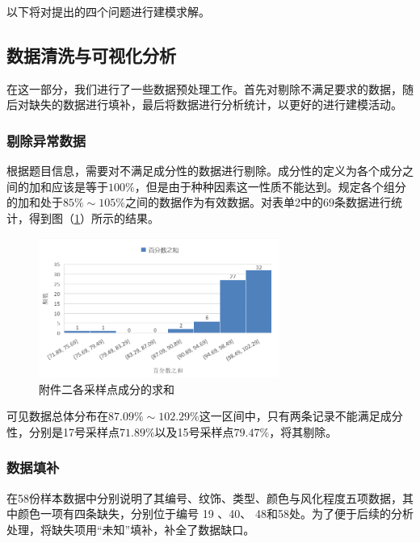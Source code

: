 \documentclass{my_paper}
\begin{document}
以下将对提出的四个问题进行建模求解。
\subsection{数据清洗与可视化分析}
在这一部分，我们进行了一些数据预处理工作。首先对剔除不满足要求的数据，随后对缺失的数据进行填补，最后将数据进行分析统计，以更好的进行建模活动。

\subsubsection{剔除异常数据}
根据题目信息，需要对不满足成分性的数据进行剔除。成分性的定义为各个成分之间的加和应该是等于$ 100\% $，但是由于种种因素这一性质不能达到。规定各个组分的加和处于$85\%\sim 105\%$之间的数据作为有效数据。对表单2中的69条数据进行统计，得到图（\ref{51}）所示的结果。
\begin {figure}[h]
\centering %
\includegraphics[width=0.7\textwidth]{51.png}
\caption{附件二各采样点成分的求和} %
\label{51}
\end {figure}

可见数据总体分布在$87.09\%\sim 102.29\%$这一区间中，只有两条记录不能满足成分性，分别是17号采样点$71.89\%$以及15号采样点$79.47\%$，将其剔除。

\subsubsection{数据填补}
在58份样本数据中分别说明了其编号、纹饰、类型、颜色与风化程度五项数据，其中颜色一项有四条缺失，分别位于编号 19 、40、 48和58处。为了便于后续的分析处理，将缺失项用“未知”填补，补全了数据缺口。
\end{document}
